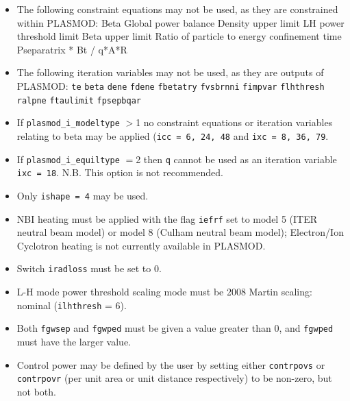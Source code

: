 \documentclass[11pt,a4paper]{report}
\begin{document}
\begin{itemize}
  
\item The following constraint equations may not be used, as they are constrained within PLASMOD:
      Beta
      Global power balance
      Density upper limit
     LH power threshold limit
     Beta upper limit
     Ratio of particle to energy confinement time
     Pseparatrix * Bt / q*A*R
  
\item The following iteration variables may not be used, as they are outputs of PLASMOD:
      \texttt{te}
      \texttt{beta}
      \texttt{dene}
      \texttt{fdene}
     \texttt{fbetatry}
     \texttt{fvsbrnni}
    \texttt{fimpvar}
    \texttt{flhthresh}
    \texttt{ralpne}
    \texttt{ftaulimit}
    \texttt{fpsepbqar}

\item If \texttt{plasmod\_i\_modeltype} $>$1 no constraint equations or iteration variables relating to beta may be applied (\texttt{icc = 6, 24, 48} and \texttt{ixc = 8, 36, 79}.

\item If \texttt{plasmod\_i\_equiltype} $=$2 then \texttt{q} cannot be used as an iteration variable \texttt{ixc = 18}. N.B. This option is not recommended.
  
\item Only \texttt{ishape = 4} may be used.

\item NBI heating must be applied with the flag \texttt{iefrf} set to model 5 (ITER neutral beam model) or model 8 (Culham neutral beam model); Electron/Ion Cyclotron heating is not currently available in PLASMOD.

\item Switch \texttt{iradloss} must be set to 0.

\item L-H mode power threshold scaling mode must be 2008 Martin scaling: nominal (\texttt{ilhthresh} = 6).

\item Both \texttt{fgwsep} and \texttt{fgwped} must be given a value greater than 0, and \texttt{fgwped} must have the larger value.

\item Control power may be defined by the user by setting either \texttt{contrpovs} or \texttt{contrpovr} (per unit area or unit distance respectively) to be non-zero, but not both.
  

\end{itemize}
\end{document}
